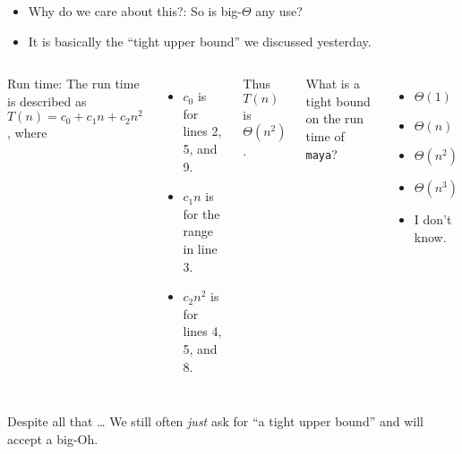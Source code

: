 \begin{frame}
	\begin{itemize}
	\item Why do we care about this?:	So is big-$\Theta$ any use?
\item It is basically the ``tight upper bound'' we discussed yesterday.
	\end{itemize}

			\begin{columns}
				
					
Run time:
						The run time is described as $T(n) = c_0 + c_1n + c_2n^2$, where
						\begin{itemize}
							\item $c_0$ is for lines 2, 5, and 9.
							\item $c_1n$ is for the range in line 3.
							\item $c_2n^2$ is for lines 4, 5, and 8.
						\end{itemize}
						Thus $T(n)$ is $\Theta(n^2)$.

						What is a tight bound on the run time of \texttt{maya}?
						\begin{itemize}
						\small
							\item $\Theta(1)$
							\item $\Theta(n)$
							\item $\Theta(n^2)$
							\item $\Theta(n^3)$
							\item I don't know.
						\end{itemize}
			\end{columns}

Despite all that \ldots
					We still often \textit{just} ask for ``a tight upper bound'' and will accept a big-Oh.

\end{frame}
